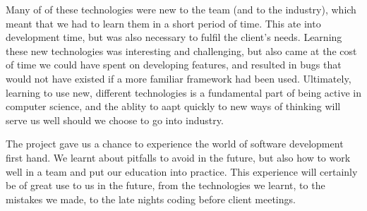 \documentclass{l3proj}
\begin{document}
Many of of these technologies were new to the team (and to the industry), 
 which meant that we had to learn them in a short period of time. This 
 ate into development time, but was also necessary to fulfil the client's 
 needs. Learning these new technologies was interesting and challenging,
 but also came at the cost of time we could have spent on developing 
 features, and resulted in bugs that would not have existed if a more 
 familiar framework had been used. Ultimately, learning to use new, different
 technologies is a fundamental part of being active in computer science,
 and the ablity to aapt quickly to new ways of thinking will serve us well
 should we choose to go into industry.
 
The project gave us a chance to experience the world of software development
 first hand. We learnt about pitfalls to avoid in the future, but also how 
 to work well in a team and put our education into practice. This experience
 will certainly be of great use to us in the future, from the technologies we
 learnt, to the mistakes we made, to the late nights coding before client meetings.

\newpage

\end{document}
